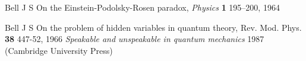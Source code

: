 \documentclass{article}
\begin{document}
\begin{thebibliography}{12}
Bell J S
On the Einstein-Podolsky-Rosen paradox,
{\em Physics} {\bf 1} 195--200, 1964

Bell J S 
On the problem of hidden variables in quantum theory,
Rev. Mod. Phys. {\bf 38} 447-52, 1966
{\em Speakable and unspeakable in quantum mechanics} 1987
(Cambridge University Press) 


% 
% 
% 
% 
% 
% 
% 
% 
% 
% 
% 
% 
% 
% 
% 
% 
% 
% 
% 
% 
% 


\end{thebibliography}
\end{document}
